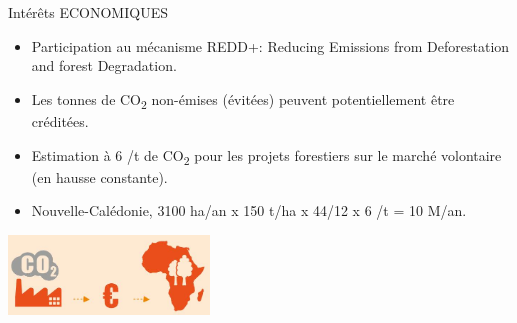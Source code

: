 \documentclass[10pt,table,dvipsnames,compress]{beamer}
\begin{document}
\begin{frame}[label={sec:orgf18a307}]{Intérêts ECONOMIQUES}
\begin{itemize}
\item Participation au mécanisme REDD+: Reducing Emissions from Deforestation and forest Degradation.
\item Les tonnes de CO\textsubscript{2} non-émises (évitées) peuvent \alert{potentiellement} être créditées.
\item Estimation à 6 \texteuro{}/t de CO\textsubscript{2} pour les projets forestiers sur le marché volontaire (en hausse constante).
\item Nouvelle-Calédonie, 3100 ha/an x 150 t/ha x 44/12 x 6 \texteuro{}/t = 10 M\texteuro{}/an.
\end{itemize}

\begin{center}
\includegraphics[width=0.4\textwidth]{figs/REDD.jpg}
\end{center}
\end{frame}
\end{document}
